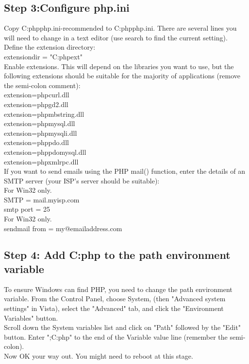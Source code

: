 \subsection*{Step 3:Configure php.ini}
Copy C:phpphp.ini-recommended to C:phpphp.ini. There are several lines you will need to change in a text editor (use search to find the current setting).\\
Define the extension directory:\\
extensiondir = "C:phpext"\\
Enable extensions. This will depend on the libraries you want to use, but the following extensions should be suitable for the majority of applications (remove the semi-colon comment):\\
extension=phpcurl.dll\\
extension=phpgd2.dll\\
extension=phpmbstring.dll\\
extension=phpmysql.dll\\
extension=phpmysqli.dll\\
extension=phppdo.dll\\
extension=phppdomysql.dll\\
extension=phpxmlrpc.dll\\
If you want to send emails using the PHP mail() function, enter the details of an SMTP server (your ISP's server should be suitable):\\
 For Win32 only.\\
SMTP = mail.myisp.com\\
smtp port = 25\\
 For Win32 only.\\
sendmail from = my@emailaddress.com
\subsection*{Step 4: Add C:php to the path environment variable}
To ensure Windows can find PHP, you need to change the path environment variable. From the Control Panel, choose System, (then "Advanced system settings" in Vista), select the "Advanced" tab, and click the "Environment Variables" button. \\
Scroll down the System variables list and click on "Path" followed by the "Edit" button. Enter ";C:php" to the end of the Variable value line (remember the semi-colon). \\
Now OK your way out. You might need to reboot at this stage.
